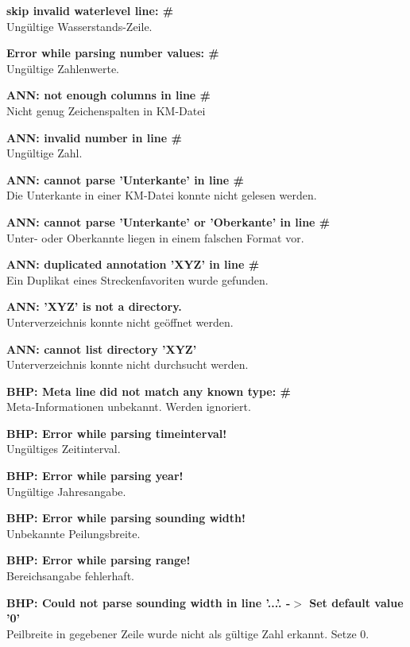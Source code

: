 \textbf{skip invalid waterlevel line: \#}
\\Ungültige Wasserstands-Zeile.

\textbf{Error while parsing number values: \#}
\\Ungültige Zahlenwerte.

\textbf{ANN: not enough columns in line \#}
\\Nicht genug Zeichenspalten in KM-Datei

\textbf{ANN: invalid number in line \#}
\\Ungültige Zahl.

\textbf{ANN: cannot parse 'Unterkante' in line \#}
\\Die Unterkante in einer KM-Datei konnte nicht gelesen werden.

\textbf{ANN: cannot parse 'Unterkante' or 'Oberkante' in line \#}
\\Unter- oder Oberkannte liegen in einem falschen Format vor.

\textbf{ANN: duplicated annotation 'XYZ' in line \#}
\\Ein Duplikat eines Streckenfavoriten wurde gefunden.

\textbf{ANN: 'XYZ' is not a directory.}
\\Unterverzeichnis konnte nicht geöffnet werden.

\textbf{ANN: cannot list directory 'XYZ'}
\\Unterverzeichnis konnte nicht durchsucht werden.

\textbf{BHP: Meta line did not match any known type: \#}
\\Meta-Informationen unbekannt. Werden ignoriert.

\textbf{BHP: Error while parsing timeinterval!}
\\Ungültiges Zeitinterval.

\textbf{BHP: Error while parsing year!}
\\Ungültige Jahresangabe.

\textbf{BHP: Error while parsing sounding width!}
\\Unbekannte Peilungsbreite.

\textbf{BHP: Error while parsing range!}
\\Bereichsangabe fehlerhaft.

\textbf{BHP: Could not parse sounding width in line '...'. -$>$ Set default value '0'}
\\Peilbreite in gegebener Zeile wurde nicht als gültige Zahl erkannt. Setze 0.

